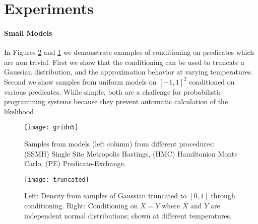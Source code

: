 
\section{Experiments}\label{experiments}

\paragraph{Small Models}
In Figures \ref{fig:density} and \ref{gridn} we demonstrate examples of conditioning on predicates which are non trivial.
First we show that the conditioning can be used to truncate a Gaussian distribution, and the approximation behavior at varying temperatures.  Second we show samples from uniform models on $[-1, 1]^2$ conditioned on various predicates.  While simple, both are a challenge for probabilistic programming systems because they prevent automatic calculation of the likelihood.

\begin{figure}[!htb]
	\centering
	\texttt{[image: gridn5]}
	\caption{Samples from models (left column) from different procedures: (SSMH) Single Site Metropolis Hastings, (HMC) Hamiltonion Monte Carlo, (PE) Predicate-Exchange.}
	\label{gridn}
\end{figure}	

\begin{figure}[!htb]
\centering
\texttt{[image: truncated]}

	
	
	\caption{Left: Density from samples of Gaussian truncated to $[0, 1]$ through conditioning. Right: Conditioning on $X = Y$ where $X$ and $Y$ are independent normal distributions; shown at different temperatures.}
	\label{fig:density}
\end{figure}



